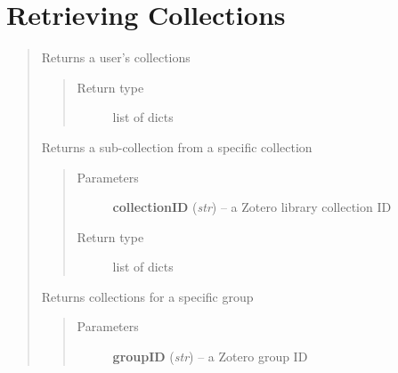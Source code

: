 \documentclass[letterpaper,10pt,english]{sphinxmanual}
\begin{document}
\section{Retrieving Collections}
\label{index:retrieving-collections}\begin{quote}

\begin{fulllineitems}
\label{index:pyzotero.zotero.Zotero.collections}
Returns a user's collections
\begin{quote}\begin{description}
\item[{Return type}] \leavevmode
list of dicts

\end{description}\end{quote}

\end{fulllineitems}


\begin{fulllineitems}
\label{index:pyzotero.zotero.Zotero.collections_sub}
Returns a sub-collection from a specific collection
\begin{quote}\begin{description}
\item[{Parameters}] \leavevmode
\textbf{collectionID} (\emph{str}) -- a Zotero library collection ID

\item[{Return type}] \leavevmode
list of dicts

\end{description}\end{quote}

\end{fulllineitems}


\begin{fulllineitems}
\label{index:pyzotero.zotero.Zotero.group_collections}
Returns collections for a specific group
\begin{quote}\begin{description}
\item[{Parameters}] \leavevmode
\textbf{groupID} (\emph{str}) -- a Zotero group ID


\end{description}
\end{quote}
\end{fulllineitems}
\end{quote}
\end{document}
